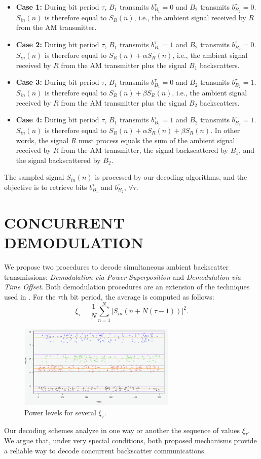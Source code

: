 \documentclass[letterpaper, 10 pt, conference]{IEEEconf}
\begin{document}
\begin{itemize}

\item \textbf{Case 1: }During bit period $\tau$, $B_1$ transmits $b_{B_1}^\tau=0$ and $B_2$ transmits $b_{B_2}^\tau=0$. $S_{in}(n)$ is therefore equal to $S_{R}(n)$, i.e., the ambient signal received by $R$ from the AM transmitter.
\item \textbf{Case 2: }During bit period $\tau$, $B_1$ transmits $b_{B_1}^\tau=1$ and $B_2$ transmits $b_{B_2}^\tau=0$. $S_{in}(n)$ is therefore equal to $S_{R}(n) + \alpha S_{R}(n)$, i.e., the ambient signal received by $R$ from the AM transmitter plus the signal $B_1$ backscatters.
\item \textbf{Case 3: }During bit period $\tau$, $B_1$ transmits $b_{B_1}^\tau=0$ and $B_2$ transmits $b_{B_2}^\tau=1$. $S_{in}(n)$ is therefore equal to $S_{R}(n) + \beta S_{R}(n)$, i.e., the ambient signal received by $R$ from the AM transmitter plus the signal $B_2$ backscatters.
\item \textbf{Case 4: }During bit period $\tau$, $B_1$ transmits $b_{B_1}^\tau=1$ and $B_2$ transmits $b_{B_2}^\tau=1$. $S_{in}(n)$ is therefore equal to $S_{R}(n)+ \alpha S_{R}(n) + \beta S_{R}(n)$. In other words, the signal $R$ must process equals the sum of the ambient signal received by $R$ from the AM transmitter, the signal backscattered by $B_1$, and the signal backscattered by $B_2$. 
\end{itemize}

The sampled signal $S_{in}(n)$ is processed by our decoding algorithms, and the objective is to retrieve bits $b_{B_1}^\tau$ and $b_{B_2}^\tau$, $\forall \tau$.


\section{CONCURRENT DEMODULATION}

We propose two procedures to decode simultaneous ambient backscatter transmissions: \textit{Demodulation via Power Superposition} and \textit{Demodulation via Time Offset}. Both demodulation procedures are an extension of the techniques used in \cite{liu2013ambient}. For the $\tau\text{th}$ bit period, the average  is computed as follows:
$$\xi_{\tau}=\frac{1}{N}\sum_{n=1}^{N}|S_{in}(n + N(\tau-1))|^2.$$

\begin{figure}[h!]
  \centerline{\includegraphics[width=75mm,scale=0.50]{Figure_2.png}}
  \caption{Power levels for several $\xi_{\tau}$.}
\end{figure}
Our decoding schemes analyze in one way or another the sequence of values $\xi_{\tau}$. We argue that, under very special conditions, both proposed mechanisms provide a reliable way to decode concurrent backscatter communications.
\end{document}
